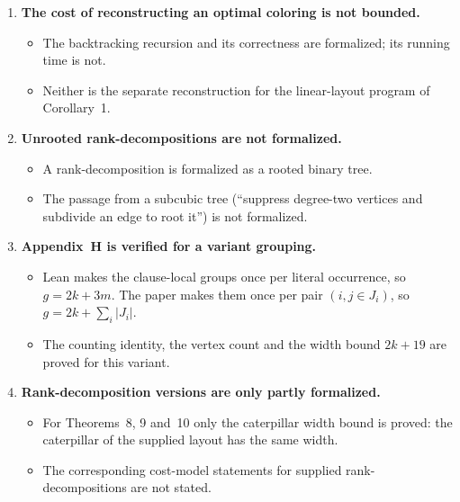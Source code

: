 \documentclass[11pt]{article}
\begin{document}
\begin{enumerate}[leftmargin=1.6em]
\begin{itemize}
      transitions of the aggregated dynamic program.
    \item Not formalized: the claims that all counts have $O(N\log N)$ bits, and that exact
      arithmetic costs a polynomial factor.
  \end{itemize}
\item \textbf{The cost of reconstructing an optimal coloring is not bounded.}
  \begin{itemize}
    \item The backtracking recursion and its correctness are formalized; its running time is not.
    \item Neither is the separate reconstruction for the linear-layout program of
      Corollary~1.
  \end{itemize}
\item \textbf{Unrooted rank-decompositions are not formalized.}
  \begin{itemize}
    \item A rank-decomposition is formalized as a rooted binary tree.
    \item The passage from a subcubic tree (``suppress degree-two vertices and subdivide an edge
      to root it'') is not formalized.
  \end{itemize}
\item \textbf{Appendix~H is verified for a variant grouping.}
  \begin{itemize}
    \item Lean makes the clause-local groups once per literal occurrence, so $g=2k+3m$. The paper
      makes them once per pair $(i,j\in J_i)$, so $g=2k+\sum_i|J_i|$.
    \item The counting identity, the vertex count and the width bound $2k+19$ are proved for this
      variant.
  \end{itemize}
\item \textbf{Rank-decomposition versions are only partly formalized.}
  \begin{itemize}
    \item For Theorems~8, 9 and~10 only the caterpillar width bound is proved: the
      caterpillar of the supplied layout has the same width.
    \item The corresponding cost-model statements for supplied rank-decompositions are not
      stated.
  \end{itemize}
\end{enumerate}
\end{document}
